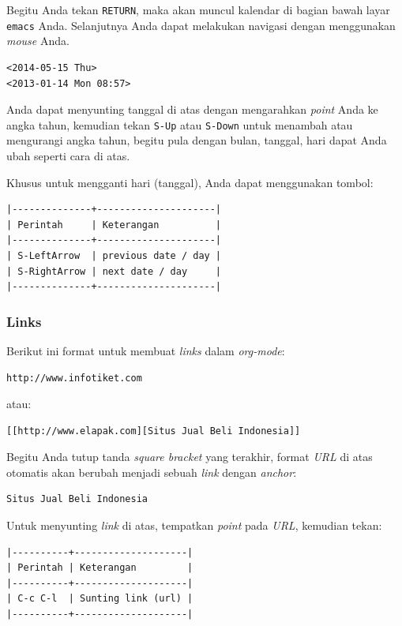 \documentclass{article}
\begin{document}
Begitu Anda tekan \verb=RETURN=, maka akan muncul kalendar di bagian bawah
layar \verb=emacs= Anda. Selanjutnya Anda dapat melakukan navigasi dengan
menggunakan \emph{mouse} Anda.

\begin{verbatim}
<2014-05-15 Thu>
<2013-01-14 Mon 08:57>
\end{verbatim}

Anda dapat menyunting tanggal di atas dengan mengarahkan \emph{point} Anda
ke angka tahun, kemudian tekan \verb=S-Up= atau \verb=S-Down= untuk 
menambah atau mengurangi angka tahun, begitu pula dengan bulan, tanggal, hari
dapat Anda ubah seperti cara di atas.

Khusus untuk mengganti hari (tanggal), Anda dapat menggunakan tombol:

\begin{verbatim}
|--------------+---------------------|
| Perintah     | Keterangan          |
|--------------+---------------------|
| S-LeftArrow  | previous date / day |
| S-RightArrow | next date / day     |
|--------------+---------------------|
\end{verbatim}

\subsubsection{Links}
Berikut ini format untuk membuat \emph{links} dalam \emph{org-mode}:

\begin{verbatim}
http://www.infotiket.com
\end{verbatim}

atau:

\begin{verbatim}
[[http://www.elapak.com][Situs Jual Beli Indonesia]]
\end{verbatim}

Begitu Anda tutup tanda \emph{square bracket} yang terakhir, format \emph{URL}
di atas otomatis akan berubah menjadi sebuah \emph{link} dengan \emph{anchor}:

\begin{verbatim}
Situs Jual Beli Indonesia
\end{verbatim}

Untuk menyunting \emph{link} di atas, tempatkan \emph{point} pada \emph{URL},
kemudian tekan:

\begin{verbatim}
|----------+--------------------|
| Perintah | Keterangan         |
|----------+--------------------|
| C-c C-l  | Sunting link (url) |
|----------+--------------------|
\end{verbatim}
\end{document}
